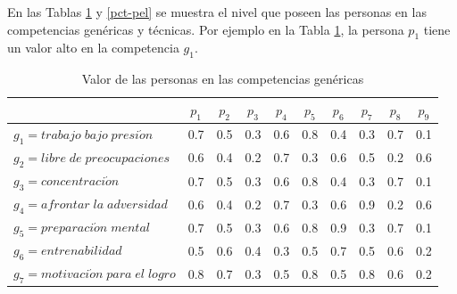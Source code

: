 
En las Tablas \ref{pcg-pel} y \ref{pct-pel} se muestra el nivel que poseen las personas en las competencias genéricas y técnicas. Por ejemplo en la Tabla \ref{pcg-pel}, la persona $ p_1 $ tiene un valor alto en la competencia $ g_1 $.

\begin{table}[H]
	\centering
	\caption{Valor de las personas en las competencias genéricas}\label{pcg-pel}
	\begin{tabular}{|l|c|c|c|c|c|c|c|c|c|}
		\hline
		\thead{$F_g(g,p)$} & $p_1$ & $p_2$ & $p_3$ & $p_4$ & $p_5$ & $p_6$ & $p_7$ & $p_8$ & $p_9$ \\ \hline  
		$g_1=trabajo\;bajo\;presi\acute{o}n$ 	& 0.7 & 0.5 & 0.3 & 0.6 & 0.8 & 0.4 & 0.3 & 0.7 & 0.1 \\ \hline
		$g_2=libre\;de\;preocupaciones$  	& 0.6 & 0.4 & 0.2 & 0.7 & 0.3 & 0.6 & 0.5 & 0.2 & 0.6 \\ \hline
		$g_3=concentraci\acute{o}n$ 	& 0.7 & 0.5 & 0.3 & 0.6 & 0.8 & 0.4 & 0.3 & 0.7 & 0.1 \\ \hline
		$g_4=afrontar\;la\;adversidad$  	& 0.6 & 0.4 & 0.2 & 0.7 & 0.3 & 0.6 & 0.9 & 0.2 & 0.6 \\ \hline
		$g_5=preparaci\acute{o}n\;mental$ 	& 0.7 & 0.5 & 0.3 & 0.6 & 0.8 & 0.9 & 0.3 & 0.7 & 0.1 \\ \hline
		$g_6=entrenabilidad$ 	& 0.5 & 0.6 & 0.4 & 0.3 & 0.5 & 0.7 & 0.5 & 0.6 & 0.2 \\ \hline
		$g_7=motivaci\acute{o}n\;para\;el\;logro$  	& 0.8 & 0.7 & 0.3 & 0.5 & 0.8 & 0.5 & 0.8 & 0.6 & 0.2 \\ \hline
		
	\end{tabular}
\end{table}

